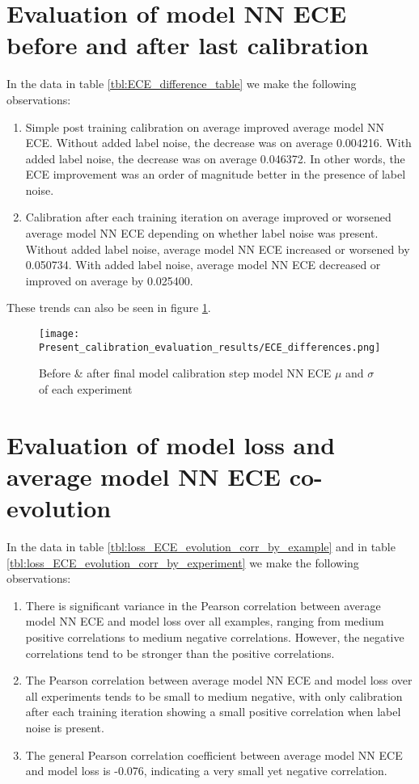 \section{Evaluation of model NN ECE before and after last calibration}
In the data in table \ref{tbl:ECE_difference_table} we make the following observations:
\begin{enumerate}
  \item Simple post training calibration on average improved average model NN ECE. Without added label noise, the decrease was on average 0.004216. With added label noise, the decrease was on average 0.046372. In other words, the ECE improvement was an order of magnitude better in the presence of label noise.
  \item Calibration after each training iteration on average improved or worsened average model NN ECE depending on whether label noise was present. Without added label noise, average model NN ECE increased or worsened by 0.050734. With added label noise, average model NN ECE decreased or improved on average by 0.025400.
\end{enumerate}
These trends can also be seen in figure \ref{fig:ECE_difference}.

\begin{figure}[htbp!]
  \centering
  \texttt{[image: Present\_calibration\_evaluation\_results/ECE\_differences.png]}
  \caption[Before \& after final model calibration step model NN ECE $\mu$ and $\sigma$ of each experiment]{Before \& after final model calibration step model NN ECE $\mu$ and $\sigma$ of each experiment}
  \label{fig:ECE_difference}
\end{figure}
\newpage

\section{Evaluation of model loss and average model NN ECE co-evolution}
In the data in table \ref{tbl:loss_ECE_evolution_corr_by_example} and in table \ref{tbl:loss_ECE_evolution_corr_by_experiment} we make the following observations:
\begin{enumerate}
  \item There is significant variance in the Pearson correlation between average model NN ECE and model loss over all examples, ranging from medium positive correlations to medium negative correlations. However, the negative correlations tend to be stronger than the positive correlations.
  \item The Pearson correlation between average model NN ECE and model loss over all experiments tends to be small to medium negative, with only calibration after each training iteration showing a small positive correlation when label noise is present.
  \item The general Pearson correlation coefficient between average model NN ECE and model loss is -0.076, indicating a very small yet negative correlation.
\end{enumerate}

